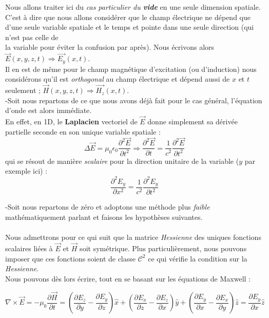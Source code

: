 \documentclass[a4paper,12pt]{article}
\begin{document}
Nous allons traiter ici du \textit{cas particulier du \textbf{vide}} en une seule dimension spatiale.  \\
C'est à dire que nous allons considérer que le champ électrique ne dépend que d'une seule variable spatiale et le temps et pointe dans une seule direction (qui n'est pas celle de \\la variable pour éviter la confusion par après).
Nous écrivons alors $\vec{E}(x,y,z,t) \Rightarrow \vec{E_{y}}(x,t)$. \\Il en est de même pour le champ magnétique d'excitation (ou d'induction) nous considérons qu'il est 
\textit{orthogonal} au champ électrique et dépend aussi de $x$ et $t$ seulement ; $\vec{H}(x,y,z,t) \Rightarrow \vec{H_{z}}(x,t)$. \\ 


-Soit nous repartons de ce que nous avons déjà fait pour le cas général, l'équation d'onde est alors immédiate. \\
En effet, en 1D, le \textbf{Laplacien} vectoriel de $\vec{E}$ donne simplement sa dérivée partielle seconde en son unique variable
spatiale : 
\[ \Delta \vec{E} = \mu_{0} \epsilon_{0}  \frac{\partial^{2} \vec{E}}{\partial t^{2}} \Rightarrow \frac{\partial^{2} \vec{E} }{\partial t} = \frac{1}{c^{2}}  \frac{\partial^{2} \vec{E}}{\partial t^{2}}\]
qui se résout de manière \textit{scalaire} pour la direction unitaire de la variable ($y$ par exemple ici) : 
\[\frac{\partial^{2} E_{y}}{\partial x^{2}} = \frac{1}{c^{2}}  \frac{\partial^{2} E_{y}}{\partial t^{2}}\]


-Soit nous repartons de zéro et adoptons une méthode plus \textit{faible} mathématiquement parlant et faisons les hypothèses suivantes. \\ \\
Nous admettrons pour ce qui suit que la matrice \textit{Hessienne} des uniques fonctions scalaires liées à $\vec{E}$ et $\vec{H}$ soit symétrique. 
Plus particulièrement, nous pouvons imposer que ces fonctions soient de classe $\mathcal{C}^{2}$ ce qui vérifie la condition sur la \textit{Hessienne}. \\ 

Nous pouvons dès lors écrire, tout en se basant sur les équations de Maxwell : 

\[\nabla \times \vec{E} = -\mu_{0} \frac{\partial \vec{H}}{\partial t} = (\frac{\partial E_{z}}{\partial y} - \frac{\partial E_{y}}{\partial z})\hat{x} +   (\frac{\partial E_{x}}{\partial z} - \frac{\partial E_{z}}{\partial x})\hat{y} +
 (\frac{\partial E_{y}}{\partial x} - \frac{\partial E_{x}}{\partial y})\hat{z} = \frac{\partial E_{y}}{\partial x} \hat{z}
\]
\end{document}
